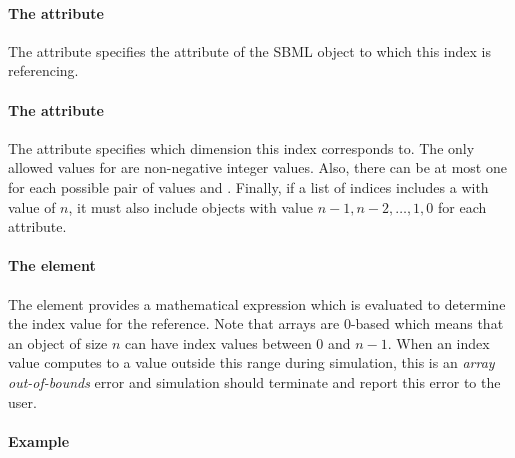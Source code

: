 \paragraph{The  attribute}

The  attribute specifies the attribute of the SBML object to which this index is referencing.    

\paragraph{The  attribute}

The  attribute specifies which dimension this index corresponds to.
The only allowed values for  are
  non-negative integer values. Also, there can be at most one \Index for
  each possible pair of values
 and . Finally, if a list of indices includes a
\Index with  value of $n$, it must also
include \Index objects with value $n-1, n-2, \dots , 1, 0$ for each  attribute.

\paragraph{The  element}

The  element provides a mathematical expression which is evaluated to determine the index value for the reference.   Note that arrays are 0-based which means that an object of size $n$ can have index values between 0 and $n-1$.   When an index value computes to a value outside this range during simulation, this is an \emph{array out-of-bounds} error and simulation should terminate and report this error to the user.

\paragraph{Example}

